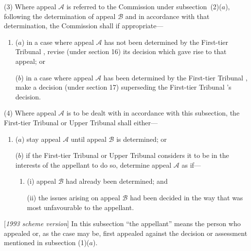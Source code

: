 \documentclass[12pt,a4paper]{article}
\begin{document}
(3) Where appeal $\mathcal{A}$ is referred to the 
Commission  %
under subsection~(2)($a$), following the determination of appeal $\mathcal{B}$ and in accordance with that determination, 
the Commission  %
shall if appropriate—
\begin{enumerate}\item[]
($a$) in a case where appeal $\mathcal{A}$ has not been determined by the 
First-tier Tribunal%
, revise (under section 16) 
its  %
decision which gave rise to that appeal; or

($b$) in a case where appeal $\mathcal{A}$ has been determined by the 
First-tier Tribunal%
, make a decision (under section 17) superseding the 
First-tier Tribunal%
’s decision.
\end{enumerate}

(4) Where appeal $\mathcal{A}$ is to be dealt with in accordance with this subsection, the 
First-tier Tribunal or Upper Tribunal  %
shall either—
\begin{enumerate}\item[]
($a$) stay appeal $\mathcal{A}$ until appeal $\mathcal{B}$ is determined; or

($b$) if the 
First-tier Tribunal or Upper Tribunal  %
considers it to be in the interests of the appellant to do so, determine appeal $\mathcal{A}$ as if—
\begin{enumerate}\item[]
(i) appeal $\mathcal{B}$ had already been determined; and

(ii) the issues arising on appeal $\mathcal{B}$ had been decided in the way that was most unfavourable to the appellant.
\end{enumerate}
\end{enumerate}

[\emph{1993 scheme version}] In this subsection “the appellant” means the person who appealed or, as the case may be, first appealed against the decision or assessment mentioned in subsection (1)($a$).
\end{document}
